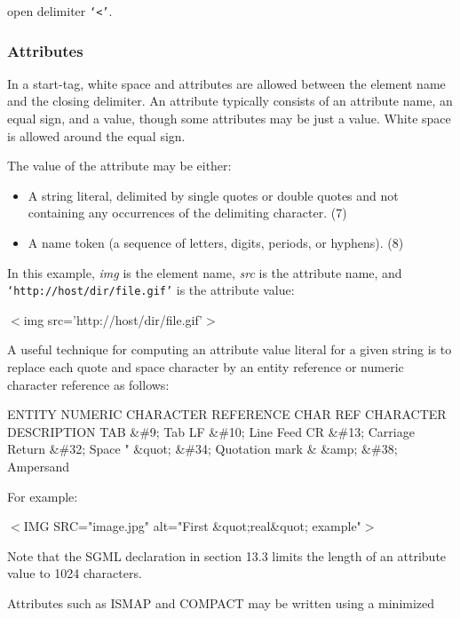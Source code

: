 open delimiter {\tt `$<$'}.
\par \subsubsection*{Attributes}\par 
In a start-tag, white space and attributes are allowed between the
element name and the closing delimiter.  An attribute typically
consists of an attribute name, an equal sign, and a value, though
some attributes may be just a value.  White space is allowed around
the equal sign.
\par \par 
The value of the attribute may be either:
\par \begin{itemize}\item 
A string literal, delimited by single quotes or double quotes and
not containing any occurrences of the delimiting character.
(7)\item 
A name token (a sequence of letters, digits, periods, or hyphens).
(8)\end{itemize}\par 
In this example, {\it img} is the element name, {\it src} is the
attribute name, and {\tt `http://host/dir/file.gif'} is the
attribute value:
\par $<$img src='http://host/dir/file.gif'$>$
\par 
A useful technique for computing an attribute value literal for a
given string is to replace each quote and space character by an
entity reference or numeric character reference as follows:
\par                  ENTITY      NUMERIC
       CHARACTER REFERENCE   CHAR REF     CHARACTER DESCRIPTION
         TAB                 \&\#9;         Tab
         LF                  \&\#10;        Line Feed
         CR                  \&\#13;        Carriage Return
                             \&\#32;        Space
         "       \&quot;      \&\#34;        Quotation mark 
         \&       \&amp;       \&\#38;        Ampersand 
\par 
For example:
\par $<$IMG SRC="image.jpg" alt="First \&quot;real\&quot; example"$>$
\par 
Note that the SGML declaration in section 13.3 limits the length of
an attribute value to 1024 characters.
\par \par 
Attributes such as ISMAP and COMPACT may be written using a minimized
